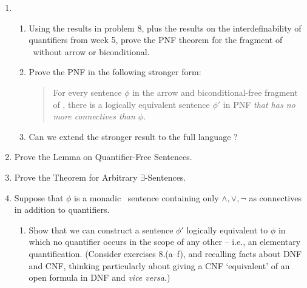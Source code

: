 {\begin{enumerate}
\begin{enumerate}
	\item Show that, where $\upsilon$ is not free in $\psi$, that $\psi \wedge \forall\upsilon\phi \equiv \forall\upsilon(\psi \wedge \phi)$.
	\item Show that, where $\upsilon$ is not free in $\psi$, that $\psi \wedge \exists\upsilon\phi \equiv \exists\upsilon(\psi \wedge \phi)$.
	\item Show that, where $\upsilon$ is not free in $\psi$, that $\psi \vee \forall\upsilon\phi \equiv \forall\upsilon(\psi \vee \phi)$.
	\item Show that, where $\upsilon$ is not free in $\psi$, that $\psi \vee \exists\upsilon\phi \equiv \exists\upsilon(\psi \vee \phi)$.	
	\item Show that $\forall \upsilon \phi \wedge \forall \upsilon\psi \equiv \forall\upsilon(\phi\wedge\psi)$.
	\item Show that $\exists \upsilon \phi \vee \exists \upsilon\psi \equiv \exists\upsilon(\phi\vee\psi)$.
	\end{enumerate}
	\item \begin{enumerate}
		\item Using the results in problem 8, plus the results on the interdefinability of quantifiers from week 5, prove the PNF theorem for the fragment of \ltwo\ without arrow or biconditional.
		\item Prove the PNF in the following stronger form: \begin{quotation}
			For every sentence $\phi$ in the arrow and biconditional-free fragment of \ltwo, there is a logically equivalent sentence $\phi'$ in PNF \emph{that has no more connectives than $\phi$}.\end{quotation} 
		\item Can we extend the stronger result to the full language \ltwo?
	\end{enumerate}
	\item Prove the Lemma on Quantifier-Free Sentences.
	\item Prove the Theorem for Arbitrary $\exists$-Sentences.
	\item Suppose that $\phi$ is a monadic \ltwo\ sentence containing only $\wedge,\vee,\neg$ as connectives in addition to quantifiers.\begin{enumerate}
		\item Show that we can construct a sentence $\phi'$ logically equivalent to $\phi$ in which no quantifier occurs in the scope of any other – i.e., an elementary quantification. (Consider exercises 8.(a--f), and recalling facts about DNF and CNF, thinking particularly about giving a CNF `equivalent' of an open formula in DNF and \emph{vice versa}.)

\end{enumerate}
\end{enumerate}}
